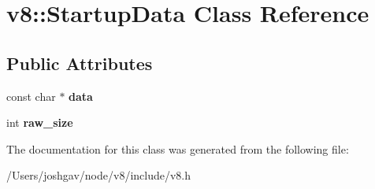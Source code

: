 \hypertarget{classv8_1_1_startup_data}{}\section{v8\+:\+:Startup\+Data Class Reference}
\label{classv8_1_1_startup_data}
\subsection*{Public Attributes}
\begin{DoxyCompactItemize}
\item 
const char $\ast$ {\bfseries data}\hypertarget{classv8_1_1_startup_data_a8daf0c5282d7c465988757dc4ecda1af}{}\label{classv8_1_1_startup_data_a8daf0c5282d7c465988757dc4ecda1af}

\item 
int {\bfseries raw\+\_\+size}\hypertarget{classv8_1_1_startup_data_a2f797e167b2bebd18ddca83dedda6ffa}{}\label{classv8_1_1_startup_data_a2f797e167b2bebd18ddca83dedda6ffa}

\end{DoxyCompactItemize}


The documentation for this class was generated from the following file\+:\begin{DoxyCompactItemize}
\item 
/\+Users/joshgav/node/v8/include/v8.\+h\end{DoxyCompactItemize}
